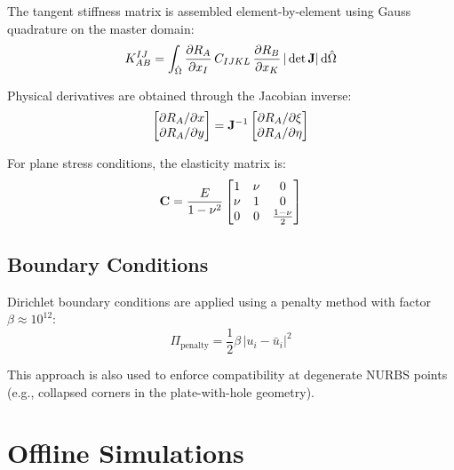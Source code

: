 The tangent stiffness matrix is assembled element-by-element using Gauss quadrature on the master domain:
\begin{equation}
    K_{AB}^{IJ} = \int_{\hat{\Omega}} \frac{\partial R_A}{\partial x_I} \, C_{IJKL} \, \frac{\partial R_B}{\partial x_K} \, |\det\mathbf{J}| \, \mathrm{d}\hat{\Omega}
\end{equation}

Physical derivatives are obtained through the Jacobian inverse:
\begin{equation}
    \begin{bmatrix} \partial R_A / \partial x \\ \partial R_A / \partial y \end{bmatrix} = \mathbf{J}^{-1} \begin{bmatrix} \partial R_A / \partial \xi \\ \partial R_A / \partial \eta \end{bmatrix}
\end{equation}

For plane stress conditions, the elasticity matrix is:
\begin{equation}
    \mathbf{C} = \frac{E}{1 - \nu^2} \begin{bmatrix} 1 & \nu & 0 \\ \nu & 1 & 0 \\ 0 & 0 & \frac{1-\nu}{2} \end{bmatrix}
\end{equation}

\subsection{Boundary Conditions}

Dirichlet boundary conditions are applied using a penalty method with factor $\beta \approx 10^{12}$:
\begin{equation}
    \Pi_{\text{penalty}} = \frac{1}{2} \beta \, |u_i - \bar{u}_i|^2
\end{equation}

This approach is also used to enforce compatibility at degenerate NURBS points (e.g., collapsed corners in the plate-with-hole geometry).

\section{Offline Simulations}
\label{sec:offline}

